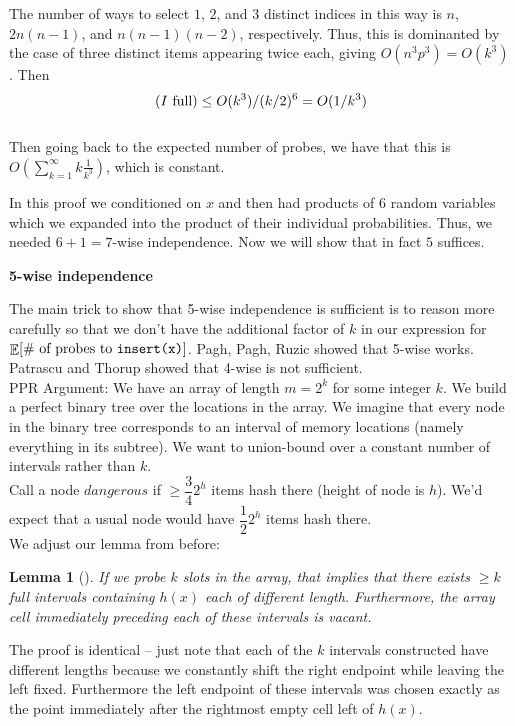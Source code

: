 \documentclass[11pt]{article}
\DeclareMathOperator*{\E}{\mathbb{E}}
\let\Pr\relax
\DeclareMathOperator*{\Pr}{\mathbb{P}}
\newtheorem{lemma}[theorem]{Lemma}
\theoremstyle{definition}
\begin{document}
The number of ways to select $1$, $2$, and $3$ distinct indices in this way is $n$, $2n(n-1)$, and $n(n-1)(n-2)$, respectively.
Thus, this is dominanted by the case of three distinct items appearing twice each, giving $O(n^3p^3) = O(k^3)$. Then
\[\Pr(I\text{ full}) \leq O(k^3)/(k/2)^6 = O(1/k^3)\]\\

Then going back to the expected number of probes, we have that this is $O(\sum_{k=1}^\infty k\frac{1}{k^3})$, which is constant.

In this proof we conditioned on $x$ and then had products of $6$ random variables which we expanded into the product
of their individual probabilities. Thus, we needed $6+1=7$-wise independence. Now we will show that in fact $5$ suffices.

\textbf{5-wise independence}

The main trick to show that 5-wise independence is sufficient is to reason more carefully so that we don't have the additional factor of $k$ in our expression for $\E[\text{\# of probes to \texttt{insert(x)}}]$. Pagh, Pagh, Ruzic \cite{ppr} showed that 5-wise works. Patrascu and Thorup \cite{pt} showed that 4-wise is not sufficient.\\

PPR Argument: We have an array of length $m=2^k$ for some integer $k$. We build a perfect binary tree over the locations in the array. We imagine that every node in the binary tree corresponds to an interval of memory locations (namely everything in its subtree). We want to union-bound over a constant number of intervals rather than $k$.\\

Call a node $dangerous$ if $\geq \dfrac{3}{4} 2^h$ items hash there (height of node is $h$). We'd expect that a usual node would have $\dfrac{1}{2} 2^{h}$ items hash there.\\

We adjust our lemma from before:
\begin{lemma}[]
If we probe $k$ slots in the array, that implies that there exists $\geq k$ full intervals containing $h(x)$ each of different length. Furthermore, the array cell immediately preceding each of these intervals is vacant.
\end{lemma}

The proof is identical -- just note that each of the $k$ intervals constructed have different lengths because we constantly shift the right endpoint while leaving the left fixed. Furthermore the left endpoint of these intervals was chosen exactly as the point immediately after the rightmost empty cell left of $h(x)$.
\end{document}
